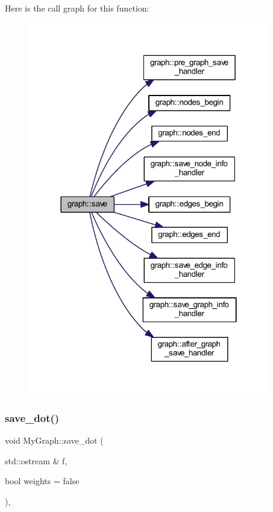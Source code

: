 Here is the call graph for this function\+:
\nopagebreak
\begin{figure}[H]
\begin{center}
\leavevmode
\includegraphics[width=298pt]{classgraph_ad53bd0f3c96616b7f2d44abdce3df6de_cgraph}
\end{center}
\end{figure}
\mbox{\label{class_my_graph_acf68ca166eebb43a80b722c6ef15d22c}} 
\subsubsection{\texorpdfstring{save\+\_\+dot()}{save\_dot()}\hspace{0.1cm}{\footnotesize\ttfamily [1/2]}}
{\footnotesize\ttfamily void My\+Graph\+::save\+\_\+dot (\begin{DoxyParamCaption}\item[{std\+::ostream \&}]{f,  }\item[{bool}]{weights = {\ttfamily false} }\end{DoxyParamCaption})\hspace{0.3cm}{\ttfamily [virtual]}, {\ttfamily [inherited]}}


